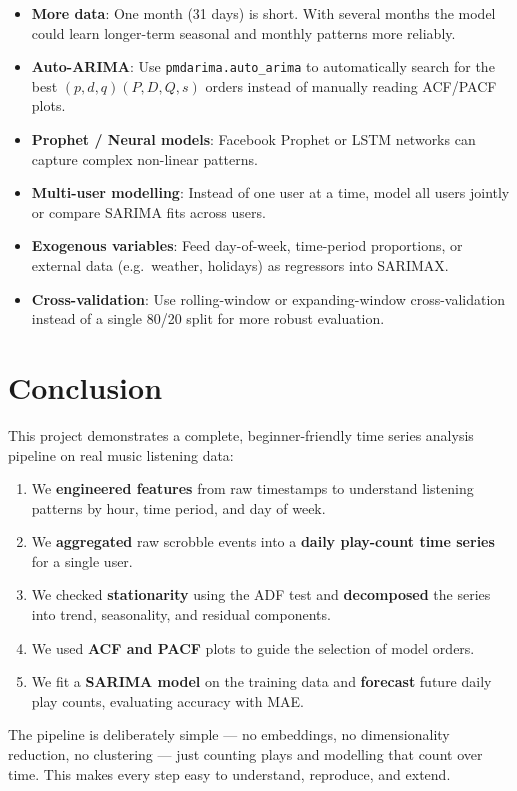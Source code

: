 \documentclass[12pt, a4paper]{article}
\begin{document}
\begin{itemize}
    \item \textbf{More data}: One month (31 days) is short. With several
          months the model could learn longer-term seasonal and monthly
          patterns more reliably.
    \item \textbf{Auto-ARIMA}: Use \texttt{pmdarima.auto\_arima} to
          automatically search for the best $(p,d,q)(P,D,Q,s)$ orders
          instead of manually reading ACF/PACF plots.
    \item \textbf{Prophet / Neural models}: Facebook Prophet or LSTM networks
          can capture complex non-linear patterns.
    \item \textbf{Multi-user modelling}: Instead of one user at a time, model
          all users jointly or compare SARIMA fits across users.
    \item \textbf{Exogenous variables}: Feed day-of-week, time-period
          proportions, or external data (e.g.\ weather, holidays) as
          regressors into SARIMAX.
    \item \textbf{Cross-validation}: Use rolling-window or expanding-window
          cross-validation instead of a single 80/20 split for more robust
          evaluation.
\end{itemize}

\section{Conclusion}

This project demonstrates a complete, beginner-friendly time series analysis
pipeline on real music listening data:

\begin{enumerate}
    \item We \textbf{engineered features} from raw timestamps to understand
          listening patterns by hour, time period, and day of week.
    \item We \textbf{aggregated} raw scrobble events into a \textbf{daily
          play-count time series} for a single user.
    \item We checked \textbf{stationarity} using the ADF test and
          \textbf{decomposed} the series into trend, seasonality, and
          residual components.
    \item We used \textbf{ACF and PACF} plots to guide the selection of
          model orders.
    \item We fit a \textbf{SARIMA model} on the training data and
          \textbf{forecast} future daily play counts, evaluating accuracy
          with MAE.
\end{enumerate}

The pipeline is deliberately simple --- no embeddings, no dimensionality
reduction, no clustering --- just counting plays and modelling that count
over time. This makes every step easy to understand, reproduce, and extend.

\end{document}
